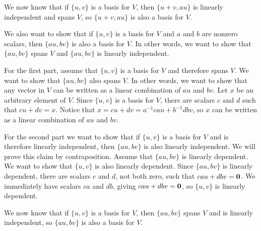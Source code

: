 We now know that if $\{u,v\}$ is a basis for $V$, then
$\{u+v,au\}$ is linearly independent and spans $V$,
so $\{u+v,au\}$ is also a basis for $V$.

We also want to show that if $\{u,v\}$ is a basis for $V$
and $a$ and $b$ are nonzero scalars,
then $\{au,bv\}$ is also a basis for $V$.
In other words, we want to show that $\{au,bv\}$ spans $V$
and $\{au,bv\}$ is linearly independent.

For the first part, assume that $\{u,v\}$ is a basis for $V$
and therefore spans $V$.
We want to show that $\{au,bv\}$ also spans $V$.
In other words, we want to show that any vector in $V$
can be written as a linear combination of $au$ and $bv$.
Let $x$ be an arbitrary element of $V$.
Since $\{u,v\}$ is a basis for $V$,
there are scalars $c$ and $d$ such that $cu + dv = x$.
Notice that $x = cu + dv = a^{-1}cau + b^{-1}dbv$,
so $x$ can be written as a linear combination of $au$ and $bv$.

For the second part we want to show that if $\{u,v\}$
is a basis for $V$ and is therefore linearly independent,
then $\{au,bv\}$ is also linearly independent.
We will prove this claim by contraposition.
Assume that $\{au,bv\}$ is linearly dependent.
We want to show that $\{u,v\}$ is also linearly dependent.
Since $\{au,bv\}$ is linearly dependent,
there are scalars $c$ and $d$, not both zero,
such that $cau + dbv = {\bf 0}$.
We immediately have scalars $ca$ and $db$, giving
$cau + dbv = {\bf 0}$, so $\{u,v\}$ is linearly dependent.

We now know that if $\{u,v\}$ is a basis for $V$,
then $\{au,bv\}$ spans $V$ and is linearly independent,
so $\{au,bv\}$ is also a basis for $V$.
\bye
